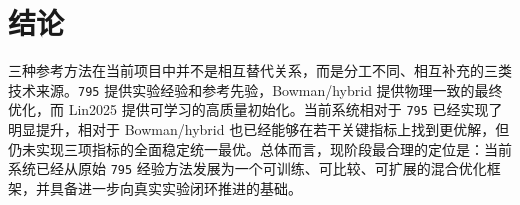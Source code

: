 \documentclass[12pt,a4paper]{ctexart}
\begin{document}
\section{结论}
三种参考方法在当前项目中并不是相互替代关系，而是分工不同、相互补充的三类技术来源。\texttt{795} 提供实验经验和参考先验，Bowman/hybrid 提供物理一致的最终优化，而 Lin2025 提供可学习的高质量初始化。当前系统相对于 \texttt{795} 已经实现了明显提升，相对于 Bowman/hybrid 也已经能够在若干关键指标上找到更优解，但仍未实现三项指标的全面稳定统一最优。总体而言，现阶段最合理的定位是：当前系统已经从原始 \texttt{795} 经验方法发展为一个可训练、可比较、可扩展的混合优化框架，并具备进一步向真实实验闭环推进的基础。
\end{document}
